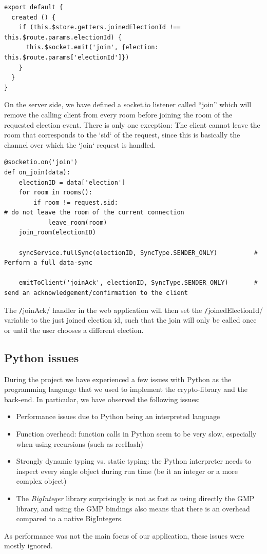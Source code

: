 \begin{verbatim}
export default {
  created () {
    if (this.$store.getters.joinedElectionId !== this.$route.params.electionId) {
      this.$socket.emit('join', {election: this.$route.params['electionId']})
    }
  }
}
\end{verbatim}
On the server side, we have defined a socket.io listener called "`join"' which will remove the calling client from every room before joining the room of the requested election event. There is only one exception: The client cannot leave the room that corresponds to the `sid` of the request, since this is basically the channel over which the `join` request is handled.
\begin{verbatim}
@socketio.on('join')
def on_join(data):
    electionID = data['election']
    for room in rooms():
        if room != request.sid:																	# do not leave the room of the current connection
            leave_room(room)
    join_room(electionID)

    syncService.fullSync(electionID, SyncType.SENDER_ONLY)			# Perform a full data-sync

    emitToClient('joinAck', electionID, SyncType.SENDER_ONLY)		# send an acknowledgement/confirmation to the client
\end{verbatim}

The \texttt/joinAck/ handler in the web application will then set the \texttt/joinedElectionId/ variable to the just joined election id, such that the join will only be called once or until the user chooses a different election.

\subsection{Python issues} \label{ssec:PythonIssues}

During the project we have experienced a few issues with Python as the programming language that we used to implement the crypto-library and the back-end. In particular, we have observed the following issues:

\begin{itemize}
	\item Performance issues due to Python being an interpreted language
	\item Function overhead: function calls in Python seem to be very slow, especially when using recursions (such as recHash)
	\item Strongly dynamic typing vs. static typing: the Python interpreter needs to inspect every single object during run time (be it an integer or a more complex object)
	\item The \textit{BigInteger} library surprisingly is not as fast as using directly the GMP library, and using the GMP bindings also means that there is an overhead compared to a native BigIntegers.
\end{itemize}
As performance was not the main focus of our application, these issues were mostly ignored.

